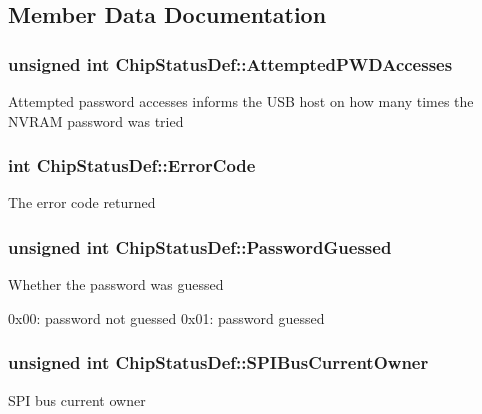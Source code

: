\subsection{\-Member \-Data \-Documentation}
\hypertarget{struct_chip_status_def_a775f8cb07137f324ce59e7bbc961fd55}{
\subsubsection[{\-Attempted\-P\-W\-D\-Accesses}]{\setlength{\rightskip}{0pt plus 5cm}unsigned int {\bf \-Chip\-Status\-Def\-::\-Attempted\-P\-W\-D\-Accesses}}}\label{struct_chip_status_def_a775f8cb07137f324ce59e7bbc961fd55}
\-Attempted password accesses informs the \-U\-S\-B host on how many times the \-N\-V\-R\-A\-M password was tried \hypertarget{struct_chip_status_def_ab359484a0244ec153c49f0af23c2d29b}{
\subsubsection[{\-Error\-Code}]{\setlength{\rightskip}{0pt plus 5cm}int {\bf \-Chip\-Status\-Def\-::\-Error\-Code}}}\label{struct_chip_status_def_ab359484a0244ec153c49f0af23c2d29b}
\-The error code returned \hypertarget{struct_chip_status_def_ae83bf4d444de30c1a451f9aef7ce4d6f}{
\subsubsection[{\-Password\-Guessed}]{\setlength{\rightskip}{0pt plus 5cm}unsigned int {\bf \-Chip\-Status\-Def\-::\-Password\-Guessed}}}\label{struct_chip_status_def_ae83bf4d444de30c1a451f9aef7ce4d6f}
\-Whether the password was guessed

0x00\-: password not guessed 0x01\-: password guessed \hypertarget{struct_chip_status_def_ac8d8808a7cf921e77831dc4e30e8d096}{
\subsubsection[{\-S\-P\-I\-Bus\-Current\-Owner}]{\setlength{\rightskip}{0pt plus 5cm}unsigned int {\bf \-Chip\-Status\-Def\-::\-S\-P\-I\-Bus\-Current\-Owner}}}\label{struct_chip_status_def_ac8d8808a7cf921e77831dc4e30e8d096}
\-S\-P\-I bus current owner

